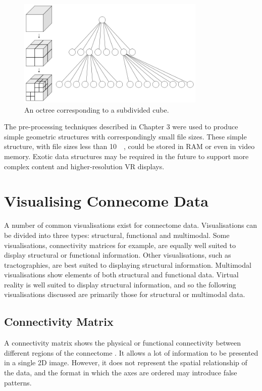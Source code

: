 \documentclass[MSc,paper=a4,pagesize=auto]{icldt}
\begin{document}
\begin{figure}[htbp!]
    \centering
    \includegraphics[width=0.8\textwidth]{resources/octtree}
    \caption{An octree corresponding to a subdivided cube.\cite{octtree2010}}
    \label{fig:octtree}
\end{figure}

The pre-processing techniques described in Chapter 3 were used to produce simple geometric structures with correspondingly small file sizes. These simple structure, with file sizes less than \SI{10}{\mega\byte}, could be stored in RAM or even in video memory. Exotic data structures may be required in the future to support more complex content and higher-resolution VR displays.
\clearpage

\section{Visualising Connecome Data}
A number of common visualisations exist for connectome data. Visualisations can be divided into three types: structural, functional and multimodal. Some visualisations, connectivity matrices for example, are equally well suited to display structural or functional information. Other visualisations, such as tractographies, are best suited to displaying structural information. Multimodal visualisations show elements of both structural and functional data. Virtual reality is well suited to display structural information, and so the following visualisations discussed are primarily those for structural or multimodal data.

\subsection{Connectivity Matrix}
A connectivity matrix shows the physical or functional connectivity between different regions of the connectome \cite{Wang2011}. It allows a lot of information to be presented in a single 2D image. However, it does not represent the spatial relationship of the data, and the format in which the axes are ordered may introduce false patterns. 
\end{document}
